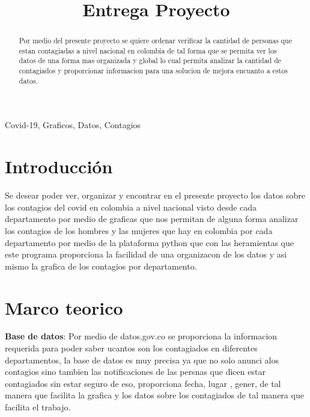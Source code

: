 \documentclass[conference,compsoc,onecolumn]{IEEEtran}
\begin{document}
\title{Entrega Proyecto 
}

\author{
\and
{}
}

\maketitle

\begin{abstract}
Por medio del presente proyecto se quiere ordenar verificar la cantidad de personas que estan contagiadas a nivel nacional en colombia de tal forma que se permita ver los datos de una forma mas organizada y global lo cual permita analizar la cantidad de contagiados y proporcionar informacion para una solucion de mejora encuanto a estos datos.
    
\end{abstract}

\begin{IEEEkeywords}
Covid-19, Graficos, Datos, Contagios 
\end{IEEEkeywords}

\section{Introducción}
Se desear poder ver, organizar y encontrar en el presente proyecto los datos sobre los contagios del covid en colombia a nivel nacional visto desde cada departamento por medio de graficas que nos permitan de alguna forma analizar los contagios de los hombres y las mujeres que hay en colombia por cada departamento por medio de la plataforma python que con las heramientas que este programa proporciona la facilidad de una  organizacon de los datos y asi mismo la grafica de los contagios por departamento.

\section{Marco teorico}

\textbf{Base de datos}: Por medio de datos.gov.co \cite{CovidColombia} se proporciona la informacion requerida para poder saber ucantos son los contagiados en diferentes departamentos, la base de datos es muy precisa ya que no solo anunci alos contagios sino tambien las notificaciones de las persnas que dicen estar contagiados sin estar seguro de eso, proporciona fecha, lugar , gener, de tal manera que facilita la grafica y los datos sobre los contagiados de tal manera que facilita el trabajo.\\
\end{document}
